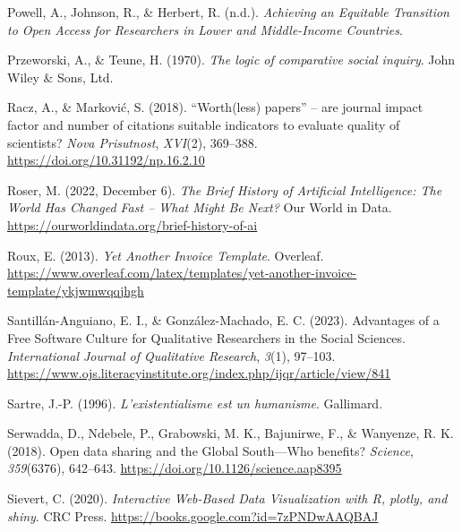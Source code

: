 \documentclass[
  letterpaper,
  DIV=11,
  numbers=noendperiod]{scrreprt}
\newlength{\cslhangindent}
\newlength{\cslentryspacingunit} %
\newenvironment{CSLReferences}[2] %
 {%
  \setlength{\parindent}{0pt}
  \ifodd #1
  \let\oldpar\par
  \def\par{\hangindent=\cslhangindent\oldpar}
  \fi
  \setlength{\parskip}{#2\cslentryspacingunit}
 }%
 {}
\begin{document}
\begin{CSLReferences}{1}{0}
\leavevmode{}%
Powell, A., Johnson, R., \& Herbert, R. (n.d.). \emph{Achieving an
{Equitable Transition} to {Open Access} for {Researchers} in {Lower} and
{Middle-Income Countries}}.

\leavevmode{}%
Przeworski, A., \& Teune, H. (1970). \emph{The logic of comparative
social inquiry}. John Wiley \& Sons, Ltd.

\leavevmode{}%
Racz, A., \& Marković, S. (2018). {``{Worth}(less) papers''} -- are
journal impact factor and number of citations suitable indicators to
evaluate quality of scientists? \emph{Nova Prisutnost}, \emph{XVI}(2),
369--388. \url{https://doi.org/10.31192/np.16.2.10}

\leavevmode{}%
Roser, M. (2022, December 6). \emph{The {Brief History} of {Artificial
Intelligence}: {The World Has Changed Fast} -- {What Might Be Next}?}
Our World in Data. \url{https://ourworldindata.org/brief-history-of-ai}

\leavevmode{}%
Roux, E. (2013). \emph{Yet {Another Invoice Template}}. Overleaf.
\url{https://www.overleaf.com/latex/templates/yet-another-invoice-template/ykjwmwqqjhgh}

\leavevmode{}%
Santillán-Anguiano, E. I., \& González-Machado, E. C. (2023). Advantages
of a {Free Software Culture} for {Qualitative Researchers} in the
{Social Sciences}. \emph{International Journal of Qualitative Research},
\emph{3}(1), 97--103.
\url{https://www.ojs.literacyinstitute.org/index.php/ijqr/article/view/841}

\leavevmode{}%
Sartre, J.-P. (1996). \emph{L'existentialisme est un humanisme}.
Gallimard.

\leavevmode{}%
Serwadda, D., Ndebele, P., Grabowski, M. K., Bajunirwe, F., \& Wanyenze,
R. K. (2018). Open data sharing and the {Global South}---{Who} benefits?
\emph{Science}, \emph{359}(6376), 642--643.
\url{https://doi.org/10.1126/science.aap8395}

\leavevmode{}%
Sievert, C. (2020). \emph{Interactive {Web-Based Data Visualization}
with {R}, plotly, and shiny}. CRC Press.
\url{https://books.google.com?id=7zPNDwAAQBAJ}


\end{CSLReferences}
\end{document}
